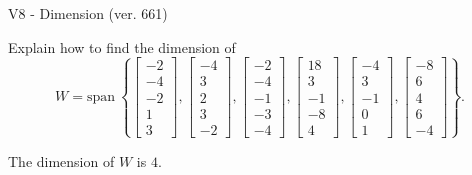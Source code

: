 \begin{exercise}
  \begin{exerciseTitle}V8 - Dimension (ver. 661)\end{exerciseTitle}
  \begin{exerciseStatement}
    Explain how to find the dimension of 
\[W=\mathrm{span}\ \left\{\left[\begin{array}{r}
-2 \\
-4 \\
-2 \\
1 \\
3
\end{array}\right] , \left[\begin{array}{r}
-4 \\
3 \\
2 \\
3 \\
-2
\end{array}\right] , \left[\begin{array}{r}
-2 \\
-4 \\
-1 \\
-3 \\
-4
\end{array}\right] , \left[\begin{array}{r}
18 \\
3 \\
-1 \\
-8 \\
4
\end{array}\right] , \left[\begin{array}{r}
-4 \\
3 \\
-1 \\
0 \\
1
\end{array}\right] , \left[\begin{array}{r}
-8 \\
6 \\
4 \\
6 \\
-4
\end{array}\right]\right\}.\]



  \end{exerciseStatement}
  \begin{exerciseAnswer}
   The dimension of \(W\) is  \(4\).
  


  \end{exerciseAnswer}
\end{exercise}